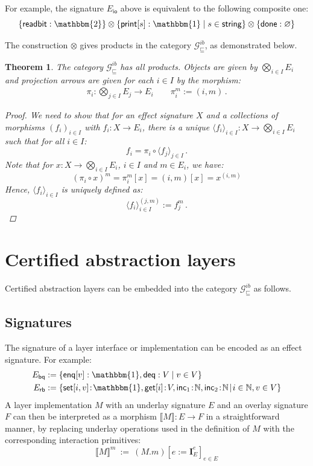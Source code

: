 \documentclass[11pt,oneside,draft]{book}
\newtheorem{theorem}{Theorem}[chapter]
\theoremstyle{definition}
\newcommand{\gcat}{\mathcal{G}_{\sqsubseteq}}
\newcommand{\kw}[1]{\ensuremath{ \mathsf{#1} }}
\begin{document}
For example,
the signature $E_\kw{io}$ above is equivalent
to the following composite one:
\[
    \{ \kw{readbit} : \mathbbm{2} \} \otimes
    \{ \kw{print}[s] : \mathbbm{1} \mid s \in \kw{string} \} \otimes
    \{ \kw{done} : \varnothing \}
\]

The construction $\otimes$ gives products in the category $\gcat^{ib}$,
as demonstrated below.

\begin{theorem}
The category $\gcat^{ib}$ has all products.
Objects are given by $\bigotimes_{i \in I} E_i$
and projection arrows are
given for each $i \in I$ by
the morphism:
\begin{gather*}
    \pi_i : \bigotimes_{j \in I} E_j \rightarrow E_i \qquad
    \pi_i^m := (i, m) \,.
\end{gather*}
\begin{proof}
We need to show that for an effect signature $X$
and a collections of morphisms $(f_i)_{i \in I}$ with
$f_i : X \rightarrow E_i$,
there is a unique
$\langle f_i \rangle_{i \in I} : X \rightarrow \bigotimes_{i \in I} E_i$
such that for all $i \in I$:
\[
    f_i = \pi_i \circ \langle f_j \rangle_{j \in I} \,.
\]
Note that for $x : X \rightarrow \bigotimes_{i \in I} E_i$,
$i \in I$ and $m \in E_i$, we have:
\[
    (\pi_i \circ x)^m = \pi_i^m[x] = (i, m) [x] = x^{(i, m)}
\]
Hence, $\langle f_i \rangle_{i \in I}$ is uniquely defined as:
\[
    \langle f_i \rangle_{i \in I}^{(j, m)} := f_j^m \,.
\]
\end{proof}
\end{theorem}


\section{Certified abstraction layers} \label{sec:intspec:cal} %

Certified abstraction layers can be embedded into
the category $\gcat^{ib}$ as follows.

\subsection{Signatures} %

The signature of a layer interface or implementation
can be encoded as an effect signature.
For example:
\begin{align*}
  E_\kw{bq} &:= \{
    \kw{enq}[v] : \mathbbm{1}, \kw{deq} : V \mid
    v \in V \} \\
  E_\kw{rb} &:= \{
    \kw{set}[i, v] \! : \! \mathbbm{1},
    \kw{get}[i] \! : \! V,
    \kw{inc}_1 \! : \! \mathbb{N},
    \kw{inc}_2 \! : \! \mathbb{N} \! \mid \!
    i \in \mathbb{N}, v \in V \}
\end{align*}
A layer implementation $M$ with
an underlay signature $E$ and
an overlay signature $F$
can then be interpreted as a morphism
$\llbracket M \rrbracket : E \rightarrow F$
in a straightforward manner,
by replacing underlay operations
used in the definition of $M$
with the corresponding interaction primitives:
\[
  \llbracket M \rrbracket^m \: := \: (M.m)[e := \mathbf{I}_E^e]_{e \in E}
\]
\end{document}
